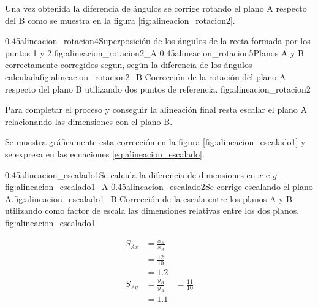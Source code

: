          Una vez obtenida la diferencia de ángulos se corrige rotando el plano A respecto del B como se muestra en la figura \ref{fig:alineacion_rotacion2}.

\subfigab
            {0.45}{alineacion_rotacion4}{Superposición de los ángulos de la recta formada por los puntos 1 y 2.}{fig:alineacion_rotacion2_A}
            {0.45}{alineacion_rotacion5}{Planos A y B correctamente corregidos segun, según la diferencia de los ángulos calculada}{fig:alineacion_rotacion2_B}
            {Corrección de la rotación del plano A respecto del plano B utilizando dos puntos de referencia.}
            {fig:alineacion_rotacion2}

         Para completar el proceso y conseguir la alineación final resta escalar el plano A relacionando las dimensiones con el plano B.\par
         Se muestra gráficamente esta corrección en la figura \ref{fig:alineacion_escalado1} y se expresa en las ecuaciones \ref{eq:alineacion_escalado}.

\subfigab
         {0.45}{alineacion_escalado1}{Se calcula la diferencia de dimensiones en $x$ e $y$}{fig:alineacion_escalado1_A}
         {0.45}{alineacion_escalado2}{Se corrige escalando el plano A.}{fig:alineacion_escalado1_B}
         {Corrección de la escala entre los planos A y B utilizando como factor de escala las dimensiones relativas entre los dos planos.}
         {fig:alineacion_escalado1}

         \begin{equation}
            \begin{aligned}
               S_{Ax} &= \frac{x_B}{x_A}\\
                      &= \frac{12}{10}\\
                      &= 1.2\\
               S_{Ay} &= \frac{y_B}{y_A}
                      &= \frac{11}{10}\\
                      &= 1.1\\
            \end{aligned}
            \label{eq:alineacion_escalado}
         \end{equation}


